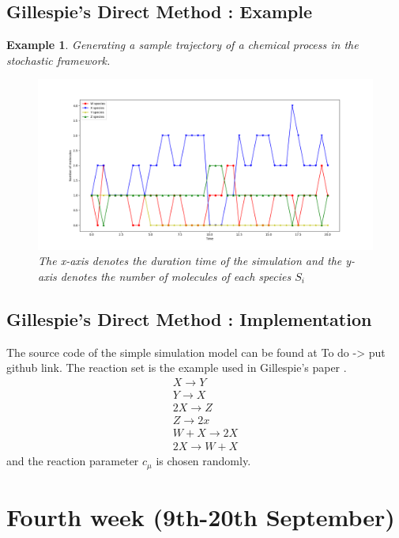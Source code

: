 \documentclass[11pt,a4paper]{article}
\newtheorem{example}[theorem]{Example}
\begin{document}
\subsection{Gillespie's Direct Method : Example}
\begin{example}{Generating a sample trajectory of a chemical process in the stochastic framework.}
    \begin{figure}[!h]
    \centering
    \includegraphics[width=1\textwidth]{Images/Figure_1.png}
    \caption{The x-axis denotes the duration time of the simulation and the y-axis denotes the number of molecules of each species $S_{i}$}
    \label{fig: Single sample trajectory}
    \end{figure}
\end{example}

\subsection{Gillespie's Direct Method : Implementation}
The source code of the simple simulation model can be found at To do -> put github link. The reaction set is the example used in Gillespie's paper \cite{gillespie_general_1976}.
\begin{gather}
  {X \rightarrow Y}      \\
  {Y \rightarrow X}      \\
  {2X \rightarrow Z}     \\
  {Z \rightarrow 2x}     \\
  {W + X \rightarrow 2X} \\
  {2X \rightarrow W + X}
\end{gather} and the reaction parameter $c_{\mu}$ is chosen randomly.

\section{Fourth week (9th-20th September)}
\end{document}
